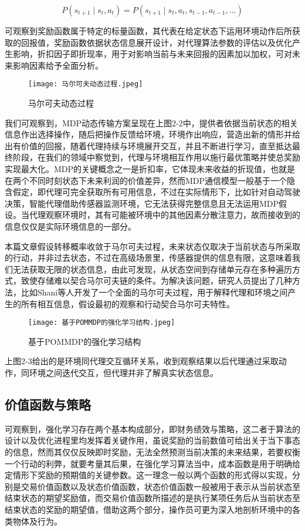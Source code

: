 \[
P(s_{t+1} \mid s_t, a_t) = P(s_{t+1} \mid s_t, a_t, s_{t-1}, a_{t-1}, \ldots)
\]

可观察到奖励函数属于特定的标量函数，其代表在给定状态下运用环境动作后所获取的回报值，奖励函数依据状态信息展开设计，对代理算法参数的评估以及优化产生影响，折扣因子即折现率，用于对影响当前与未来回报的因素加以加权，可对未来影响因素给予全面分析。

\begin{figure}[hbt]
	\centering
	\texttt{[image: 马尔可夫动态过程.jpeg]}
	\caption{马尔可夫动态过程}
	\label{f.example}
\end{figure}

我们可观察到，MDP动态传输方案呈现在上图2-2中，提供者依据当前状态的相关信息作出选择操作，随后把操作反馈给环境，环境作出响应，营造出新的情形并给出有价值的回报，随着代理持续与环境展开交互，并且不断进行学习，直至抵达最终阶段，在我们的领域中察觉到，代理与环境相互作用以施行最优策略并使总奖励实现最大化。MDP的关键概念之一是折扣率，它体现未来收益的折现值，也就是在两个不同时刻状态下未来利润的价值差异，然而MDP通信模型一般基于一个隐含假定，即代理可完全获取所有可用信息，不过在实际情形下，比如针对自动驾驶决策，智能代理借助传感器监测环境，它无法获得完整信息且无法运用MDP假设。当代理观察环境时，其有可能被环境中的其他因素分散注意力，故而接收到的信息仅仅是实际环境信息的一部分。

本篇文章假设转移概率收敛于马尔可夫过程，未来状态仅取决于当前状态与所采取的行动，并非过去状态，不过在高级场景里，传感器提供的信息有限，这意味着我们无法获取无限的状态信息，由此可发现，从状态空间到存储单元存在多种遍历方式，致使存储难以契合马尔可夫链的条件。为解决该问题，研究人员提出了几种方法，比如Shani\cite{shani2013survey}等人开发了一个全面的马尔可夫过程，用于解释代理和环境之间产生的所有相互信息，假设最初的观察和行动契合马尔可夫特性。

\begin{figure}[hbt]
	\centering
	\texttt{[image: 基于POMMDP的强化学习结构.jpeg]}
	\caption{基于POMMDP的强化学习结构}
	\label{f.example}
\end{figure}

上图2-3给出的是环境同代理交互循环关系，收到观察结果以后代理通过采取动作，同环境之间迭代交互，但代理并非了解真实状态信息。

\subsection{价值函数与策略}


可观察到，强化学习存在两个基本构成部分，即财务绩效与策略，这二者于算法的设计以及优化进程里均发挥着关键作用，虽说奖励的当前数值可给出关于当下事态的信息，然而其仅仅反映即时奖励，无法全然预测当前决策的未来结果，若要权衡一个行动的利弊，就要考量其后果，在强化学习算法当中，成本函数是用于明确给定情形下奖励的预期值的关键参数。这一理念一般以两个函数的形式得以实现，分别是交易价值函数以及状态价值函数，状态价值函数一般被用于表示从当前状态至结束状态的期望奖励值，而交易价值函数所描述的是执行某项任务后从当前状态至结束状态的奖励的期望值，借助这两个部分，操作员可更为深入地剖析环境中的各类物体及行为。

